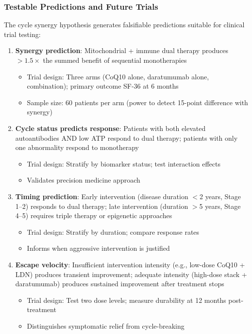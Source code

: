 \subsubsection{Testable Predictions and Future Trials}

The cycle synergy hypothesis generates falsifiable predictions suitable for clinical trial testing:

\begin{enumerate}
    \item \textbf{Synergy prediction}: Mitochondrial + immune dual therapy produces $>1.5\times$ the summed benefit of sequential monotherapies
    \begin{itemize}
        \item Trial design: Three arms (CoQ10 alone, daratumumab alone, combination); primary outcome SF-36 at 6 months
        \item Sample size: 60 patients per arm (power to detect 15-point difference with synergy)
    \end{itemize}

    \item \textbf{Cycle status predicts response}: Patients with both elevated autoantibodies AND low ATP respond to dual therapy; patients with only one abnormality respond to monotherapy
    \begin{itemize}
        \item Trial design: Stratify by biomarker status; test interaction effects
        \item Validates precision medicine approach
    \end{itemize}

    \item \textbf{Timing prediction}: Early intervention (disease duration $<$2 years, Stage 1--2) responds to dual therapy; late intervention (duration $>$5 years, Stage 4--5) requires triple therapy or epigenetic approaches
    \begin{itemize}
        \item Trial design: Stratify by duration; compare response rates
        \item Informs when aggressive intervention is justified
    \end{itemize}

    \item \textbf{Escape velocity}: Insufficient intervention intensity (e.g., low-dose CoQ10 + LDN) produces transient improvement; adequate intensity (high-dose stack + daratumumab) produces sustained improvement after treatment stops
    \begin{itemize}
        \item Trial design: Test two dose levels; measure durability at 12 months post-treatment
        \item Distinguishes symptomatic relief from cycle-breaking
    \end{itemize}
\end{enumerate}


